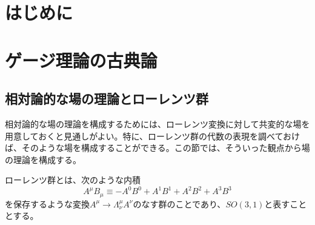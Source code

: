 \documentclass[unicode,a4paper,10pt]{ltjsarticle}
\begin{document}
\maketitle
\tableofcontents

\clearpage
\section{はじめに}



\clearpage
\section{ゲージ理論の古典論}

\subsection{相対論的な場の理論とローレンツ群}

相対論的な場の理論を構成するためには、ローレンツ変換に対して共変的な場を用意しておくと見通しがよい。特に、ローレンツ群の代数の表現を調べておけば、そのような場を構成することができる。この節では、そういった観点から場の理論を構成する。

ローレンツ群とは、次のような内積
\begin{equation}
  A^{\mu}B_{\mu}
  \equiv
  -
  A^{0}B^{0}
  +
  A^{1}B^{1}
  +
  A^{2}B^{2}
  +
  A^{3}B^{3}
\end{equation}
を保存するような変換$A^{\mu}\rightarrow\Lambda^{\mu}_{\nu}A^{\nu}$のなす群のことであり、$SO(3,1)$と表すこととする。






















\clearpage



\nocite{Peskin:1995}
\nocite{Sato:2016}
\nocite{Mogi:2001}

\end{document}
